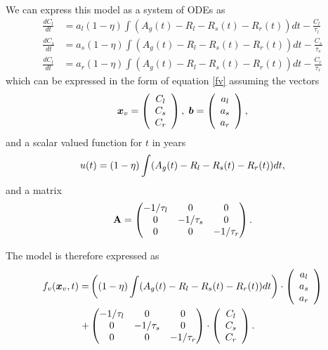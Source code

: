 \documentclass[11pt,a4paper]{article}
\begin{document}
We can express this model as a system of ODEs as
\begin{align}
\frac{dC_l}{dt} &= a_l (1-\eta) \int (A_g(t) - R_l - R_s(t) - R_r(t)) dt - \frac{C_l}{\tau_l} \\
\frac{dC_s}{dt} &= a_s (1-\eta) \int (A_g(t) - R_l - R_s(t) - R_r(t)) dt - \frac{C_s}{\tau_s} \\
\frac{dC_l}{dt} &= a_r (1-\eta) \int (A_g(t) - R_l - R_s(t) - R_r(t)) dt - \frac{C_r}{\tau_r}
\end{align}
which can be expressed in the form of equation \eqref{fv} assuming the vectors
\begin{equation}
{\bm x_v} = \left( \begin{array}{c} C_l \\ C_s \\ C_r \end{array}\right), \; {\bm b} = \left( \begin{array}{c} a_l \\ a_s \\ a_r \end{array}\right), \notag
\end{equation}
and a scalar valued function for $t$ in years
\begin{equation}
u(t) = (1-\eta) \int (A_g(t) - R_l - R_s(t) - R_r(t)) dt, \notag
\end{equation}
and a matrix
\begin{equation}
{\bf A} = \left(   \begin{matrix} %
      -1/\tau_l & 0 & 0 \\
      0 &  -1/\tau_s & 0 \\
      0 & 0 & -1/\tau_r
   \end{matrix}
  \right). \notag
\end{equation}

The model is therefore expressed as
\begin{align}
f_v({\bm x_v}, t) =& \left( (1-\eta) \int (A_g(t) - R_l - R_s (t)- R_r(t)) dt \right) \cdot  \left( \begin{array}{c} a_l \\ a_s \\ a_r \end{array}\right) \notag \\
+& \left(   \begin{matrix} %
      -1/\tau_l & 0 & 0 \\
      0 &  -1/\tau_s & 0 \\
      0 & 0 & -1/\tau_r
   \end{matrix}
  \right) \cdot \left( \begin{array}{c} C_l \\ C_s \\ C_r \end{array}\right).
\end{align}
\end{document}
